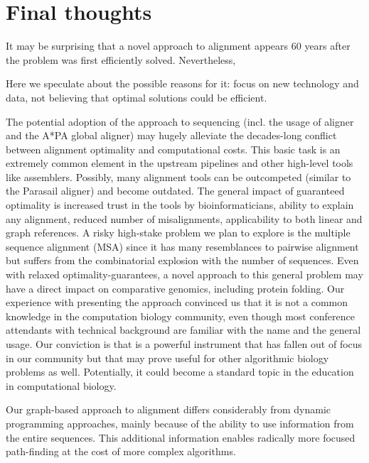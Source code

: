 \section*{Final thoughts}

It may be surprising that a novel approach to alignment appears 60 years after
the problem was first efficiently solved. Nevertheless, 

Here we speculate about the possible
reasons for it: focus on new technology and data, not believing that optimal
solutions could be efficient.

The potential adoption of the \A approach to sequencing (incl. the usage of
\astarix aligner and the A*PA global aligner) may hugely alleviate the
decades-long conflict between alignment optimality and computational costs. This
basic task is an extremely common element in the upstream pipelines and other
high-level tools like assemblers. Possibly, many alignment tools can be
outcompeted (similar to the Parasail aligner) and become outdated. The general
impact of guaranteed optimality is increased trust in the tools by
bioinformaticians, ability to explain any alignment, reduced number of
misalignments, applicability to both linear and graph references. A risky
high-stake problem we plan to explore is the multiple sequence alignment (MSA)
since it has many resemblances to pairwise alignment but suffers from the
combinatorial explosion with the number of sequences. Even with relaxed
optimality-guarantees, a novel approach to this general problem may have a
direct impact on comparative genomics, including protein folding. Our experience
with presenting the \A approach convinced us that it is not a common knowledge
in the computation biology community, even though most conference attendants
with technical background are familiar with the name and the general usage. Our
conviction is that \A is a powerful instrument that has fallen out of focus in
our community but that may prove useful for other algorithmic biology problems
as well. Potentially, it could become a standard topic in the education in
computational biology.

Our graph-based approach to alignment differs considerably from dynamic
programming approaches, mainly because of the ability to use information from the
entire sequences. This additional information enables radically more focused
path-finding at the cost of more complex algorithms.

